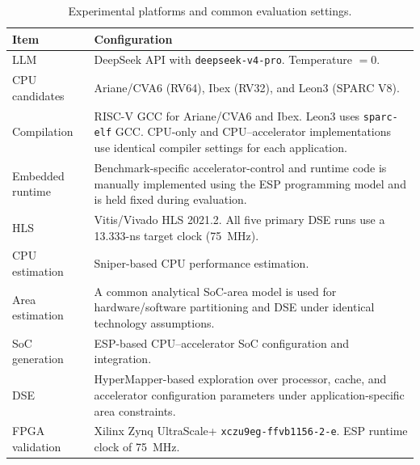 \begin{table}[!t]
\centering
\caption{Experimental platforms and common evaluation settings.}
\label{tab:experimental_setup}
\footnotesize
\renewcommand{\arraystretch}{1.10}
\setlength{\tabcolsep}{4pt}

\begin{tabularx}{\columnwidth}{p{}X}
\toprule
\textbf{Item} & \textbf{Configuration} \\
\midrule

LLM &
DeepSeek API with \texttt{deepseek-v4-pro}. Temperature $=0$. \\


CPU candidates &
Ariane/CVA6 (RV64), Ibex (RV32), and Leon3 (SPARC V8). \\

Compilation &
RISC-V GCC for Ariane/CVA6 and Ibex. Leon3 uses \texttt{sparc-elf} GCC.
CPU-only and CPU--accelerator implementations use identical compiler
settings for each application. \\

Embedded runtime &
Benchmark-specific accelerator-control and runtime code is manually
implemented using the ESP programming model and is held fixed during
evaluation. \\


HLS &
Vitis/Vivado HLS 2021.2. All five primary DSE runs use a 13.333-ns
target clock (75~MHz). \\

CPU estimation &
Sniper-based CPU performance estimation. \\

Area estimation &
A common analytical SoC-area model is used for hardware/software
partitioning and DSE under identical technology assumptions. \\


SoC generation &
ESP-based CPU--accelerator SoC configuration and integration. \\

DSE &
HyperMapper-based exploration over processor, cache, and accelerator
configuration parameters under application-specific area constraints. \\

FPGA validation &
Xilinx Zynq UltraScale+ \texttt{xczu9eg-ffvb1156-2-e}.
ESP runtime clock of 75~MHz. \\

\bottomrule
\end{tabularx}
\end{table}